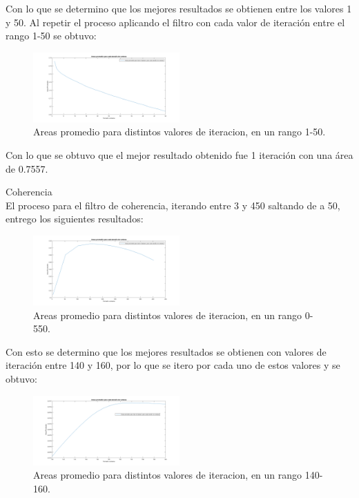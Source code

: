 Con lo que se determino que los mejores resultados se obtienen entre los valores 1 y 50. Al repetir el proceso aplicando el filtro con cada valor de iteración entre el rango 1-50 se obtuvo:

\begin{figure}[h]
	{
	\centering
	\includegraphics[width=0.50\textwidth]{Figures/AnisotropicoRangoChico}
	\caption[An Electron]{Areas promedio para distintos valores de iteracion, en un rango 1-50.}
	}
\end{figure}

Con lo que se obtuvo que el mejor resultado obtenido fue 1 iteración con una área de 0.7557.

Coherencia\\
El proceso para el filtro de coherencia, iterando entre 3 y 450 saltando de a 50, entrego los siguientes resultados:

\begin{figure}[h]
	{
	\centering
	\includegraphics[width=0.50\textwidth]{Figures/CoherenciaRangoGrande}
	\caption[An Electron]{Areas promedio para distintos valores de iteracion, en un rango 0-550.}
	}
\end{figure}

Con esto se determino que los mejores resultados se obtienen con valores de iteración entre 140 y 160, por lo que se itero por cada uno de estos valores y se obtuvo:

\begin{figure}[h]
	{
	\centering
	\includegraphics[width=0.50\textwidth]{Figures/CoherenciaRangoChico}
	\caption[An Electron]{Areas promedio para distintos valores de iteracion, en un rango 140-160.}
	}
	\end{figure}


